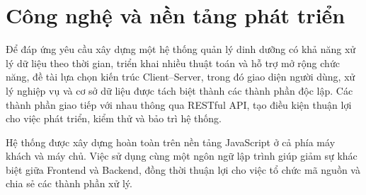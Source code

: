 \documentclass[12pt, a4paper]{report}
\begin{document}
\section{Công nghệ và nền tảng phát triển}Để đáp ứng yêu cầu xây dựng một hệ thống quản lý dinh dưỡng có khả năng xử lý dữ liệu theo thời gian, triển khai nhiều thuật toán và hỗ trợ mở rộng chức năng, đề tài lựa chọn kiến trúc Client–Server, trong đó giao diện người dùng, xử lý nghiệp vụ và cơ sở dữ liệu được tách biệt thành các thành phần độc lập. Các thành phần giao tiếp với nhau thông qua RESTful API, tạo điều kiện thuận lợi cho việc phát triển, kiểm thử và bảo trì hệ thống.

Hệ thống được xây dựng hoàn toàn trên nền tảng JavaScript ở cả phía máy khách và máy chủ. Việc sử dụng cùng một ngôn ngữ lập trình giúp giảm sự khác biệt giữa Frontend và Backend, đồng thời thuận lợi cho việc tổ chức mã nguồn và chia sẻ các thành phần xử lý.
\end{document}
